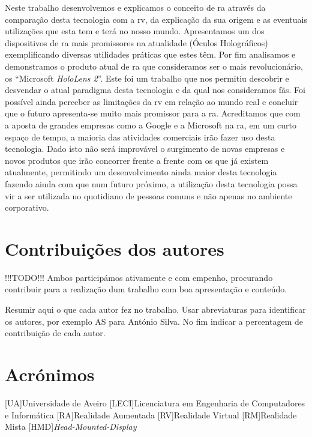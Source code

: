 \documentclass{report}
\begin{document}
Neste trabalho desenvolvemos e explicamos o conceito de \ac{ra} através da comparação desta tecnologia com a \ac{rv}, da explicação da sua origem e as eventuais utilizações que esta tem e terá no nosso mundo. Apresentamos um dos dispositivos de \ac{ra} mais promissores na atualidade (Óculos Holográficos) exemplificando diversas utilidades práticas que estes têm. Por fim analisamos e demonstramos o produto atual de \ac{ra} que consideramos ser o mais revolucionário, os “Microsoft \textit{HoloLens 2}”. Este foi um trabalho que nos permitiu descobrir e desvendar o atual paradigma desta tecnologia e da qual nos consideramos fãs. Foi possível ainda perceber as limitações da \ac{rv} em relação ao mundo real e concluir que o futuro apresenta-se muito mais promissor para a \ac{ra}. Acreditamos que com a aposta de grandes empresas como a Google e a Microsoft na \ac{ra}, em um curto espaço de tempo, a maioria das atividades comerciais irão fazer uso desta tecnologia. Dado isto não será improvável o surgimento de novas empresas e novos produtos que irão concorrer frente a frente com os que já existem atualmente, permitindo um desenvolvimento ainda maior desta tecnologia fazendo ainda com que num futuro próximo, a utilização desta tecnologia possa vir a ser utilizada no quotidiano de pessoas comuns e não apenas no ambiente corporativo.

\chapter*{Contribuições dos autores}
!!!TODO!!! Ambos participámos ativamente e com empenho, procurando contribuir para a realização dum trabalho com boa apresentação e conteúdo.

Resumir aqui o que cada autor fez no trabalho. Usar abreviaturas para identificar os autores, por exemplo AS para António Silva. No fim indicar a percentagem de contribuição de cada autor.

\chapter*{Acrónimos}
\begin{acronym}
[UA]{Universidade de Aveiro}
[LECI]{Licenciatura em Engenharia de Computadores e Informática}
[RA]{Realidade Aumentada}
[RV]{Realidade Virtual}
[RM]{Realidade Mista}
[HMD]{\textit{Head-Mounted-Display}}
\end{acronym}

\printbibliography
\end{document}
